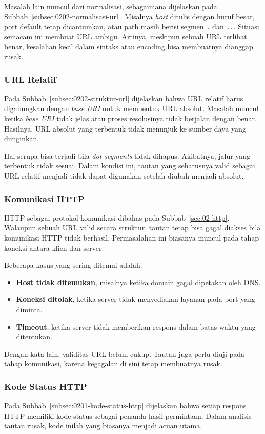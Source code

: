 Masalah lain muncul dari normalisasi, sebagaimana dijelaskan pada Subbab~\ref{subsec:0202-normalisasi-url}. Misalnya \textit{host} ditulis dengan huruf besar, port default tetap dicantumkan, atau path masih berisi segmen \texttt{.} dan \texttt{..}. Situasi semacam ini membuat URL ambigu. Artinya, meskipun sebuah URL terlihat benar, kesalahan kecil dalam sintaks atau encoding bisa membuatnya dianggap rusak.

\subsubsection*{URL Relatif}
Pada Subbab~\ref{subsec:0202-struktur-url} dijelaskan bahwa URL relatif harus digabungkan dengan \textit{base URI} untuk membentuk URL absolut. Masalah muncul ketika \textit{base URI} tidak jelas atau proses resolusinya tidak berjalan dengan benar. Hasilnya, URL absolut yang terbentuk tidak menunjuk ke sumber daya yang diinginkan.

Hal serupa bisa terjadi bila \textit{dot-segments} tidak dihapus. Akibatnya, jalur yang terbentuk tidak sesuai. Dalam kondisi ini, tautan yang seharusnya valid sebagai URL relatif menjadi tidak dapat digunakan setelah diubah menjadi absolut.

\subsubsection*{Komunikasi HTTP}
HTTP sebagai protokol komunikasi dibahas pada Subbab~\ref{sec:02-http}. Walaupun sebuah URL valid secara struktur, tautan tetap bisa gagal diakses bila komunikasi HTTP tidak berhasil. Permasalahan ini biasanya muncul pada tahap koneksi antara klien dan server.

Beberapa kasus yang sering ditemui adalah:
\begin{itemize}
  \item \textbf{Host tidak ditemukan}, misalnya ketika domain gagal dipetakan oleh DNS.
  \item \textbf{Koneksi ditolak}, ketika server tidak menyediakan layanan pada port yang diminta.
  \item \textbf{Timeout}, ketika server tidak memberikan respons dalam batas waktu yang ditentukan.
\end{itemize}

Dengan kata lain, validitas URL belum cukup. Tautan juga perlu diuji pada tahap komunikasi, karena kegagalan di sini tetap membuatnya rusak.

\subsubsection*{Kode Status HTTP}
Pada Subbab~\ref{subsec:0201-kode-status-http} dijelaskan bahwa setiap respons HTTP memiliki kode status sebagai penanda hasil permintaan. Dalam analisis tautan rusak, kode inilah yang biasanya menjadi acuan utama.

